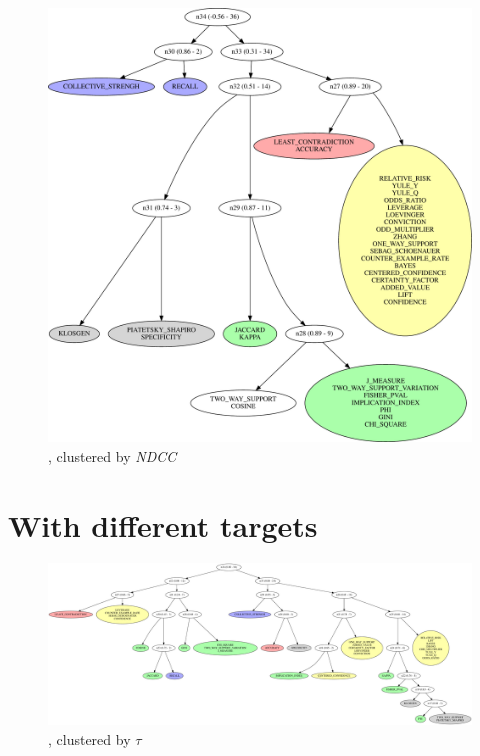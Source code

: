 \begin{figure}[th!]
  \begin{center}
  \includegraphics[width=\textwidth]{svg/rankingcom/patterns_prods_per_client2-perTarget-NDCG.pdf}
  \caption{\prodassocclient, clustered by {\em NDCC}}
  \end{center}
\end{figure}




\clearpage

\section{With different targets}
\label{sec:capa:clusters:differenttargets}


\begin{figure}[th!]
  \begin{center}
  \includegraphics[angle=90,origin=c,height=0.6\textheight]{svg/rankingcom/patterns_demo-global-KENDAL.pdf}
  \caption{\demoassoc, clustered by $\tau$}
  \end{center}
\end{figure}

